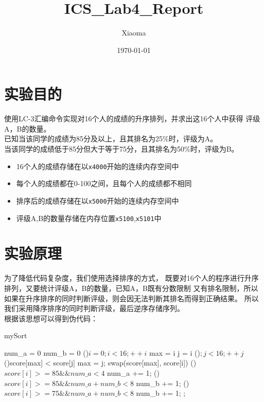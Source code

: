 \documentclass[12pt, a4paper, oneside]{ctexart}
\title{ICS\_Lab4\_Report}
\author{Xiaoma}
\date{\today}
\begin{document}
\maketitle
\section*{实验目的}
使用LC-3汇编命令实现对16个人的成绩的升序排列，并求出这16个人中获得
评级A，B的数量。\\
已知当该同学的成绩为85分及以上，且其排名为25\%时，评级为A。\\
当该同学的成绩低于85分但大于等于75分，且其排名为50\%时，评级为B。
\begin{itemize}
    \item 16个人的成绩存储在以\verb|x4000|开始的连续内存空间中
    \item 每个人的成绩都在0-100之间，且每个人的成绩都不相同
    \item 排序后的成绩存储在以\verb|x5000|开始的连续内存空间中
    \item 评级A,B的数量存储在内存位置\verb|x5100|,\verb|x5101|中
\end{itemize}

\section*{实验原理}
为了降低代码复杂度，我们使用选择排序的方式，
既要对16个人的程序进行升序排列，又要统计评级A，B的数量，已知A，B既有分数限制
又有排名限制，所以如果在升序排序的同时判断评级，则会因无法判断其排名而得到正确结果。
所以我们采用降序排序的同时判断评级，最后逆序存储序列。\\
根据该思想可以得到伪代码：
\begin{algorithm*}
    \caption{mySort}
    \label{alg:algorithm}
    \BlankLine
    num\_a = 0\;
    num\_b = 0\;
    \For(){$i = 0; i < 16; ++i$}{
        max = i\;
        j = i\;
        \For(){$;j < 16; ++j$}{
            \If(){score[max] < score[j]}{
                max = j;
            }
        }
        swap(score[max], score[i])\;
        \If(){$score[i] >= 85 \& \& num\_a < 4$}{
            num\_a += 1;
        }
        \ElseIf(){$score[i] >= 85 \& \& num\_a + num\_b < 8$}{
            num\_b += 1;
        }
        \ElseIf(){$score[i] >= 75 \& \& num\_a + num\_b < 8$}{
            num\_b += 1;
        }
    }
    ;
\end{algorithm*}
\end{document}
